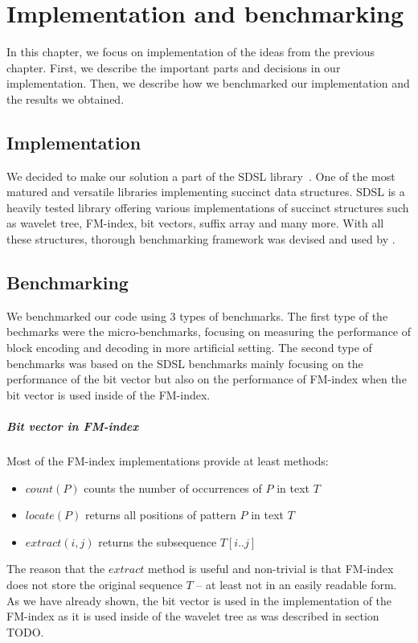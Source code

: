\chapter{Implementation and benchmarking}
\label{kap:kap4}

In this chapter, we focus on implementation of the ideas from the
previous chapter. First, we describe the important parts and
decisions in our implementation. Then, we describe how we benchmarked
our implementation and the results we obtained.

\section{Implementation}

We decided to make our solution a part of the SDSL library~\citep{gog2014theory}. One
of the most matured and versatile libraries implementing succinct data structures.
SDSL is a heavily tested library offering various implementations of succinct
structures such as wavelet tree, FM-index, bit vectors, suffix array and many more.
With all these structures, thorough benchmarking framework was devised and used
by \cite{gog2014optimized}.

\section{Benchmarking}

We benchmarked our code using 3 types of benchmarks. The first type of the bechmarks
were the micro-benchmarks, focusing on measuring the performance of block encoding
and decoding in more artificial setting. The second type of benchmarks was based on
the SDSL benchmarks mainly focusing on the performance of the bit vector but also
on the performance of FM-index when the bit vector is used inside of the FM-index.

\paragraph{Bit vector in FM-index}
Most of the FM-index implementations provide at least methods:
\begin{itemize}
	\item $\mathit{count}(P)$ counts the number of occurrences of $P$ in text $T$
	\item $\mathit{locate}(P)$ returns all positions of pattern $P$ in text $T$
	\item $\mathit{extract}(i, j)$ returns the subsequence $T[i..j]$
\end{itemize}
The reason that the $\mathit{extract}$ method is useful and non-trivial is that FM-index
does not store the original sequence $T$ -- at least not in an easily readable form.
As we have already shown, the bit vector is used in the implementation of the FM-index as it is
used inside of the wavelet tree as was described in section TODO.